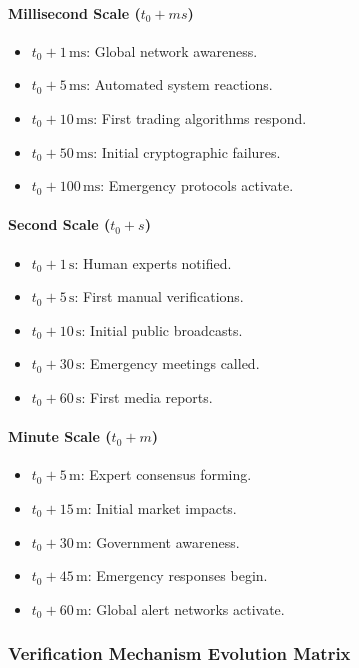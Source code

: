 \documentclass[11pt]{article}
\begin{document}
\paragraph{Millisecond Scale \quad ($t_0+ms$)}
\begin{itemize}
    \item $t_0+1\,\text{ms}$: Global network awareness.
    \item $t_0+5\,\text{ms}$: Automated system reactions.
    \item $t_0+10\,\text{ms}$: First trading algorithms respond.
    \item $t_0+50\,\text{ms}$: Initial cryptographic failures.
    \item $t_0+100\,\text{ms}$: Emergency protocols activate.
\end{itemize}

\paragraph{Second Scale \quad ($t_0+s$)}
\begin{itemize}
    \item $t_0+1\,\text{s}$: Human experts notified.
    \item $t_0+5\,\text{s}$: First manual verifications.
    \item $t_0+10\,\text{s}$: Initial public broadcasts.
    \item $t_0+30\,\text{s}$: Emergency meetings called.
    \item $t_0+60\,\text{s}$: First media reports.
\end{itemize}

\paragraph{Minute Scale \quad ($t_0+m$)}
\begin{itemize}
    \item $t_0+5\,\text{m}$: Expert consensus forming.
    \item $t_0+15\,\text{m}$: Initial market impacts.
    \item $t_0+30\,\text{m}$: Government awareness.
    \item $t_0+45\,\text{m}$: Emergency responses begin.
    \item $t_0+60\,\text{m}$: Global alert networks activate.
\end{itemize}

\subsubsection{Verification Mechanism Evolution Matrix}
\end{document}
